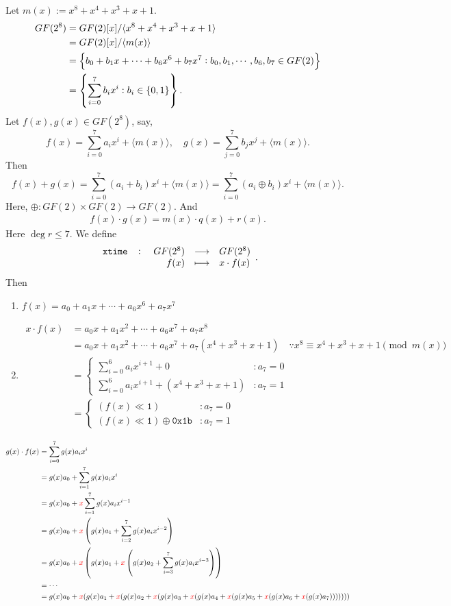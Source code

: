 Let $m(x):=x^8+x^4+x^3+x+1$.
\begin{align*}
	GF(2^8)&=GF(2)[x]/\langle x^8+x^4+x^3+x+1\rangle \\
	&=GF(2)[x]/\langle m(x)\rangle \\
	&=\set{b_0+b_1x+\cdots+b_6x^6+b_7x^7:b_0,b_1,\cdots, b_6,b_7\in GF(2)}\\
	&=\set{\sum_{i=0}^7b_ix^i:b_i\in\set{0,1}}.
\end{align*}
Let $f(x),g(x)\in GF(2^8)$, say, \[
f(x)=\sum_{i=0}^7a_ix^i+\langle m(x)\rangle,\quad g(x)=\sum_{j=0}^7b_jx^j+\langle m(x)\rangle.
\] Then
\[
f(x)+g(x)=\sum_{i=0}^7(a_i+b_i)x^i+\langle m(x)\rangle=\sum_{i=0}^7(a_i\oplus b_i)x^i+\langle m(x)\rangle.
\] Here, $\oplus:GF(2)\times GF(2)\to GF(2)$. And \begin{align*}
	f(x)\cdot g(x)=m(x)\cdot q(x) + r(x).
\end{align*} Here $\deg r \leq 7$.
\newpage
We define \[
\fullfunction{\texttt{xtime}}{GF(2^8)}{GF(2^8)}{f(x)}{x\cdot f(x)}.
\]
Then \begin{enumerate}
	\item $f(x) = a_0 + a_1x + \cdots + a_6x^6 + a_7x^7$
	\item \begin{align*}
		x\cdot f(x) &= a_0x + a_1x^2 + \cdots + a_6x^7 + a_7x^8 \\
		&= a_0x + a_1x^2 + \cdots + a_6x^7 + a_7(x^4+x^3+x+1)\quad\because x^8\equiv x^4+x^3+x+1\pmod{m(x)} \\
		&=\begin{cases}
			\sum_{i=0}^6a_ix^{i+1} + 0 &:a_7=0\\
			\sum_{i=0}^6a_ix^{i+1} + (x^4+x^3+x+1) &:a_7=1
		\end{cases} \\
		&=\begin{cases}
			(f(x) \ll \texttt{1}) &:a_7=0\\
			(f(x) \ll \texttt{1}) \oplus \texttt{0x1b} &:a_7=1
		\end{cases}
	\end{align*}
\end{enumerate}



\begin{align*}
	g(x)\cdot f(x) &= \sum_{i=0}^7g(x)a_ix^i \\
	&= g(x)a_0 + \sum_{i=1}^7g(x)a_ix^i \\
	&= g(x)a_0 + \textcolor{red}{x}\sum_{i=1}^7g(x)a_ix^{i-1} \\
	&= g(x)a_0 + \textcolor{red}{x}\left(g(x)a_1 + \sum_{i=2}^7g(x)a_ix^{i-2}\right) \\
	&= g(x)a_0 + \textcolor{red}{x}\left(g(x)a_1 + \textcolor{red}{x}\left(g(x)a_2 + \sum_{i=3}^7g(x)a_ix^{i-3}\right)\right) \\
	&= \cdots \\
	&= g(x)a_0 + \textcolor{red}{x}(g(x)a_1 + \textcolor{red}{x}(g(x)a_2 + \textcolor{red}{x}(g(x)a_3 + \textcolor{red}{x}(g(x)a_4 + \textcolor{red}{x}(g(x)a_5 + \textcolor{red}{x}(g(x)a_6 + \textcolor{red}{x}(g(x)a_7)))))))
\end{align*}

